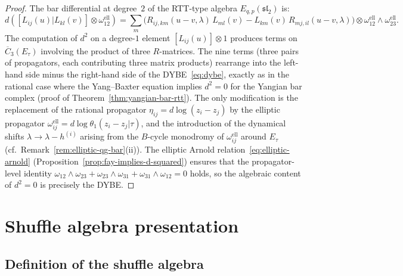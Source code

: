 \begin{proof}
The bar differential at degree~$2$ of the RTT-type algebra
$E_{q,p}(\mathfrak{sl}_2)$ is:
\[
d([L_{ij}(u) | L_{kl}(v)] \otimes \omega_{12}^{\mathrm{ell}})
= \sum_m \bigl(
R_{ij,km}(u{-}v,\lambda)\,L_{ml}(v)
- L_{km}(v)\,R_{mj,il}(u{-}v,\lambda)
\bigr) \otimes \omega_{12}^{\mathrm{ell}} \wedge \omega_{23}^{\mathrm{ell}}.
\]
The computation of $d^2$ on a degree-$1$ element
$[L_{ij}(u)] \otimes 1$ produces terms on
$\overline{C}_3(E_\tau)$ involving the product of three
$R$-matrices.  The nine terms (three pairs of propagators,
each contributing three matrix products) rearrange into
the left-hand side minus the right-hand side of
the DYBE~\eqref{eq:dybe}, exactly as in the rational case
where the Yang--Baxter equation implies $d^2 = 0$
for the Yangian bar complex
(proof of Theorem~\ref{thm:yangian-bar-rtt}).
The only modification is the replacement of the rational
propagator $\eta_{ij} = d\log(z_i - z_j)$ by the elliptic
propagator $\omega_{ij}^{\mathrm{ell}}
= d\log\theta_1(z_i - z_j|\tau)$, and the introduction
of the dynamical shifts $\lambda \to \lambda - h^{(i)}$
arising from the $B$-cycle monodromy of
$\omega^{\mathrm{ell}}_{ij}$ around $E_\tau$
(cf.\ Remark~\ref{rem:elliptic-qg-bar}(ii)).
The elliptic Arnold relation~\eqref{eq:elliptic-arnold}
(Proposition~\ref{prop:fay-implies-d-squared}) ensures that
the propagator-level identity $\omega_{12} \wedge \omega_{23}
+ \omega_{23} \wedge \omega_{31} + \omega_{31} \wedge \omega_{12}
= 0$ holds, so the algebraic content of $d^2 = 0$ is
precisely the DYBE.
\end{proof}


\section{Shuffle algebra presentation}
\label{sec:shuffle-algebra}

\subsection{Definition of the shuffle algebra}
\label{subsec:shuffle-def}

